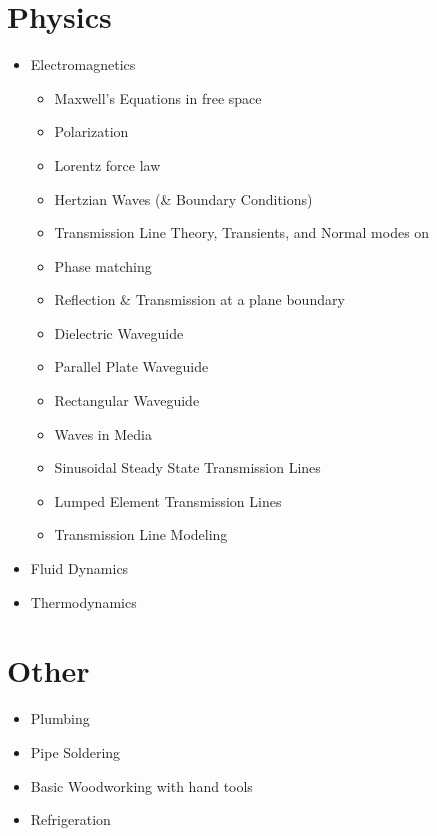 \documentclass[a4paper]{article}
\begin{document}
\section{Physics}
\begin{itemize}
\item Electromagnetics
  \begin{itemize}
  \item Maxwell's Equations in free space
  \item Polarization
  \item Lorentz force law
  \item Hertzian Waves (\& Boundary Conditions)
  \item Transmission Line Theory, Transients, and Normal modes on
  \item Phase matching
  \item Reflection \& Transmission at a plane boundary
  \item Dielectric Waveguide
  \item Parallel Plate Waveguide
  \item Rectangular Waveguide
  \item Waves in Media
  \item Sinusoidal Steady State Transmission Lines
  \item Lumped Element Transmission Lines
  \item Transmission Line Modeling
  \end{itemize}
\item Fluid Dynamics
\item Thermodynamics
\end{itemize}

\section{Other}
\begin{itemize}
\item Plumbing
\item Pipe Soldering
\item Basic Woodworking with hand tools
\item Refrigeration
\end{itemize}
\end{document}
